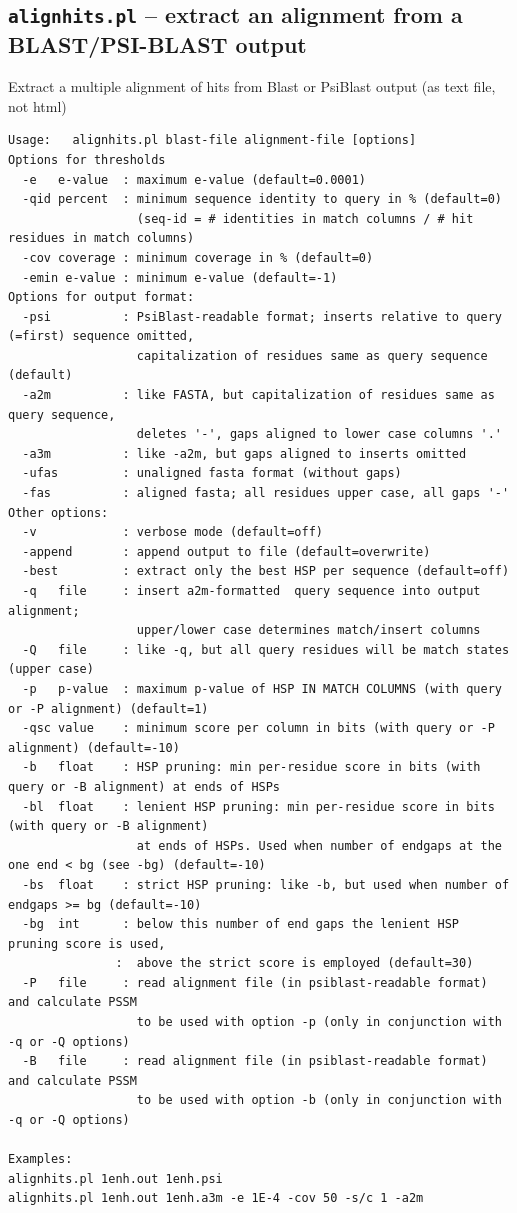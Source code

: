 \documentclass[11pt,a4paper]{article}
\begin{document}
\subsection{{\tt alignhits.pl} -- extract an alignment from a BLAST/PSI-BLAST output}

Extract a multiple alignment of hits from Blast or PsiBlast output (as text file, not html)

\small \begin{verbatim}
Usage:   alignhits.pl blast-file alignment-file [options]
Options for thresholds
  -e   e-value  : maximum e-value (default=0.0001)
  -qid percent  : minimum sequence identity to query in % (default=0) 
                  (seq-id = # identities in match columns / # hit residues in match columns)
  -cov coverage : minimum coverage in % (default=0) 
  -emin e-value : minimum e-value (default=-1)
Options for output format:
  -psi          : PsiBlast-readable format; inserts relative to query (=first) sequence omitted, 
                  capitalization of residues same as query sequence (default)
  -a2m          : like FASTA, but capitalization of residues same as query sequence,
                  deletes '-', gaps aligned to lower case columns '.'
  -a3m          : like -a2m, but gaps aligned to inserts omitted
  -ufas         : unaligned fasta format (without gaps)
  -fas          : aligned fasta; all residues upper case, all gaps '-'
Other options:
  -v            : verbose mode (default=off)
  -append       : append output to file (default=overwrite)
  -best         : extract only the best HSP per sequence (default=off)
  -q   file     : insert a2m-formatted  query sequence into output alignment;
                  upper/lower case determines match/insert columns
  -Q   file     : like -q, but all query residues will be match states (upper case)
  -p   p-value  : maximum p-value of HSP IN MATCH COLUMNS (with query or -P alignment) (default=1)
  -qsc value    : minimum score per column in bits (with query or -P alignment) (default=-10) 
  -b   float    : HSP pruning: min per-residue score in bits (with query or -B alignment) at ends of HSPs
  -bl  float    : lenient HSP pruning: min per-residue score in bits (with query or -B alignment)
                  at ends of HSPs. Used when number of endgaps at the one end < bg (see -bg) (default=-10)
  -bs  float    : strict HSP pruning: like -b, but used when number of endgaps >= bg (default=-10)
  -bg  int      : below this number of end gaps the lenient HSP pruning score is used,
               :  above the strict score is employed (default=30)
  -P   file     : read alignment file (in psiblast-readable format) and calculate PSSM
                  to be used with option -p (only in conjunction with -q or -Q options)
  -B   file     : read alignment file (in psiblast-readable format) and calculate PSSM
                  to be used with option -b (only in conjunction with -q or -Q options)

Examples: 
alignhits.pl 1enh.out 1enh.psi
alignhits.pl 1enh.out 1enh.a3m -e 1E-4 -cov 50 -s/c 1 -a2m
\end{verbatim} \normalsize
\end{document}
